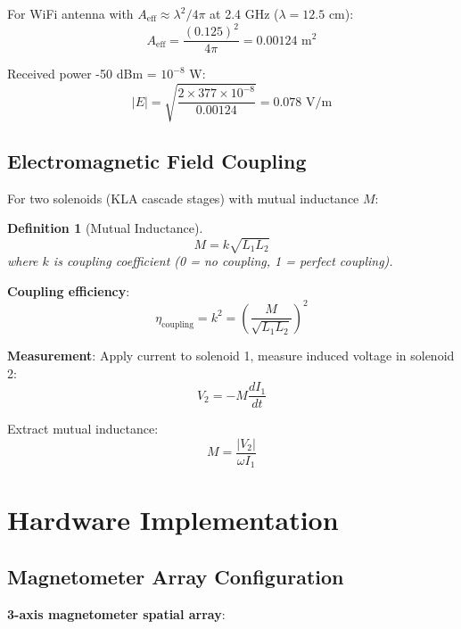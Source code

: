 \documentclass[12pt,a4paper]{article}
\newtheorem{definition}{Definition}
\begin{document}
For WiFi antenna with $A_{\text{eff}} \approx \lambda^2 / 4\pi$ at 2.4 GHz ($\lambda = 12.5$ cm):
\begin{equation}
A_{\text{eff}} = \frac{(0.125)^2}{4\pi} = 0.00124 \text{ m}^2
\end{equation}

Received power -50 dBm = $10^{-8}$ W:
\begin{equation}
|E| = \sqrt{\frac{2 \times 377 \times 10^{-8}}{0.00124}} = 0.078 \text{ V/m}
\end{equation}

\subsection{Electromagnetic Field Coupling}

For two solenoids (KLA cascade stages) with mutual inductance $M$:

\begin{definition}[Mutual Inductance]
\begin{equation}
M = k\sqrt{L_1 L_2}
\end{equation}
where $k$ is coupling coefficient (0 = no coupling, 1 = perfect coupling).
\end{definition}

\textbf{Coupling efficiency}:
\begin{equation}
\eta_{\text{coupling}} = k^2 = \left(\frac{M}{\sqrt{L_1 L_2}}\right)^2
\end{equation}

\textbf{Measurement}: Apply current to solenoid 1, measure induced voltage in solenoid 2:
\begin{equation}
V_2 = -M \frac{dI_1}{dt}
\end{equation}

Extract mutual inductance:
\begin{equation}
M = \frac{|V_2|}{\omega I_1}
\end{equation}

\section{Hardware Implementation}

\subsection{Magnetometer Array Configuration}

\textbf{3-axis magnetometer spatial array}:
\end{document}
